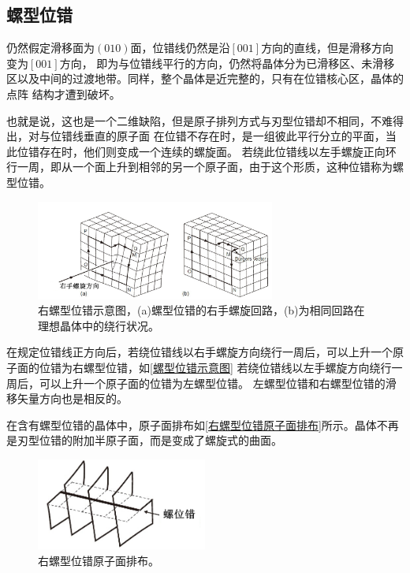             \subsection{螺型位错}
                仍然假定滑移面为$\left( 010 \right)$面，位错线仍然是沿$[001]$方向的直线，但是滑移方向变为$[001]$方向，
                即为与位错线平行的方向，仍然将晶体分为已滑移区、未滑移区以及中间的过渡地带。同样，整个晶体是近完整的，只有在位错核心区，晶体的点阵
                结构才遭到破坏。
                
                也就是说，这也是一个二维缺陷，但是原子排列方式与刃型位错却不相同，不难得出，对与位错线垂直的原子面
                在位错不存在时，是一组彼此平行分立的平面，当此位错存在时，他们则变成一个连续的螺旋面。
                若绕此位错线以左手螺旋正向环行一周，即从一个面上升到相邻的另一个原子面，由于这个形质，这种位错称为螺型位错。
                
                \begin{figure}[ht]
                    \centering
                    \includegraphics[width=0.7\textwidth]{fig/scheme_of_screw_dislocation.jpg}
                    \caption{右螺型位错示意图，(a)螺型位错的右手螺旋回路，(b)为相同回路在理想晶体中的绕行状况。}
                    \label{螺型位错示意图}
                \end{figure}

                在规定位错线正方向后，若绕位错线以右手螺旋方向绕行一周后，可以上升一个原子面的位错为右螺型位错，如\autoref{螺型位错示意图}
                若绕位错线以左手螺旋方向绕行一周后，可以上升一个原子面的位错为左螺型位错。
                左螺型位错和右螺型位错的滑移矢量方向也是相反的。

                在含有螺型位错的晶体中，原子面排布如\autoref{右螺型位错原子面排布}所示。晶体不再是刃型位错的附加半原子面，而是变成了螺旋式的曲面。
                \begin{figure}[ht]
                    \centering
                    \includegraphics[width=0.5\textwidth]{fig/arrangement_of_atom_in_screw_dislocation.jpg}
                    \caption{右螺型位错原子面排布。}
                    \label{右螺型位错原子面排布}
                \end{figure}
